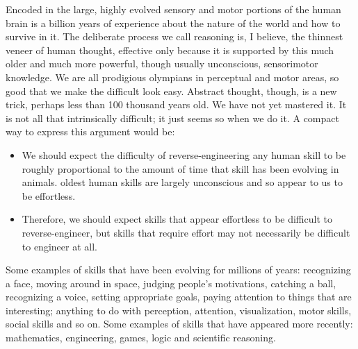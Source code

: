 \documentclass[a4paper]{article}
\begin{document}
Encoded in the large, highly evolved sensory and motor portions of the human brain is a billion years of experience about the nature of the world and how to survive in it. The deliberate process we call reasoning is, I believe, the thinnest veneer of human thought, effective only because it is supported by this much older and much more powerful, though usually unconscious, sensorimotor knowledge. We are all prodigious olympians in perceptual and motor areas, so good that we make the difficult look easy. Abstract thought, though, is a new trick, perhaps less than 100 thousand years old. We have not yet mastered it. It is not all that intrinsically difficult; it just seems so when we do it.
A compact way to express this argument would be:
\begin{itemize}
    \item We should expect the difficulty of reverse-engineering any human skill to be roughly proportional to the amount of time that skill has been evolving in animals.
    \itemThe oldest human skills are largely unconscious and so appear to us to be effortless.
    \item Therefore, we should expect skills that appear effortless to be difficult to reverse-engineer, but skills that require effort may not necessarily be difficult to engineer at all.
\end{itemize}
Some examples of skills that have been evolving for millions of years: recognizing a face, moving around in space, judging people's motivations, catching a ball, recognizing a voice, setting appropriate goals, paying attention to things that are interesting; anything to do with perception, attention, visualization, motor skills, social skills and so on.
Some examples of skills that have appeared more recently: mathematics, engineering, games, logic and scientific reasoning. 

\bigskip

\end{document}
